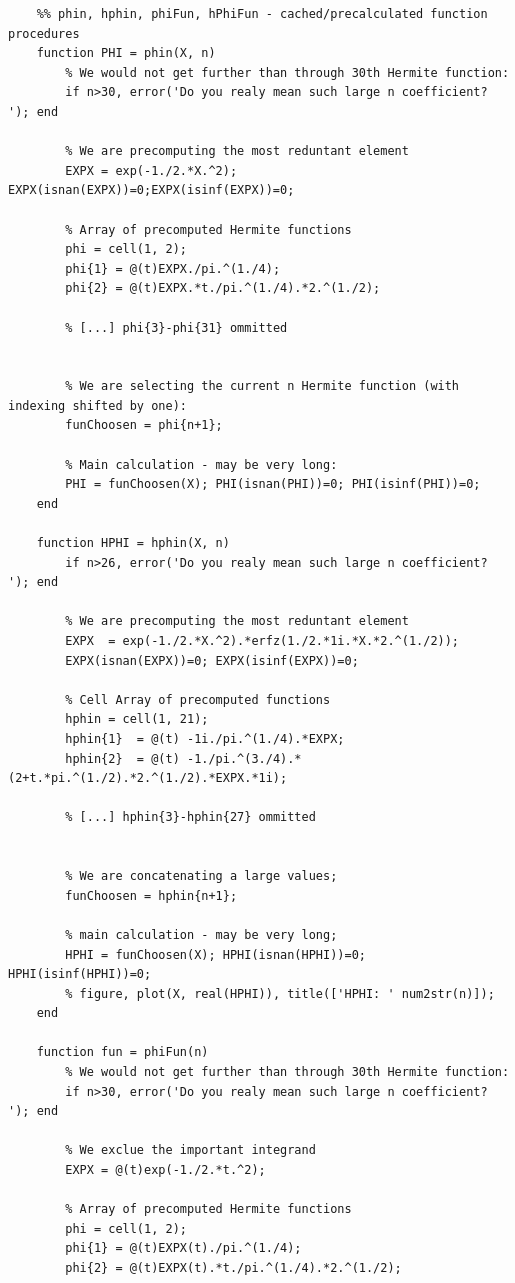 \documentclass[12pt,twoside,a4paper]{article}
\numberwithin{equation}{subsection}
\numberwithin{figure}{subsection}
\begin{document}
\begin{lstlisting}
	%% phin, hphin, phiFun, hPhiFun - cached/precalculated function procedures
	function PHI = phin(X, n)
	    % We would not get further than through 30th Hermite function:
	    if n>30, error('Do you realy mean such large n coefficient? '); end
	    
	    % We are precomputing the most reduntant element
	    EXPX = exp(-1./2.*X.^2); EXPX(isnan(EXPX))=0;EXPX(isinf(EXPX))=0;
	
	    % Array of precomputed Hermite functions
	    phi = cell(1, 2);
	    phi{1} = @(t)EXPX./pi.^(1./4);
	    phi{2} = @(t)EXPX.*t./pi.^(1./4).*2.^(1./2);
	    
	    % [...] phi{3}-phi{31} ommitted 
	    
	    
	    % We are selecting the current n Hermite function (with indexing shifted by one):
	    funChoosen = phi{n+1};
	    
	    % Main calculation - may be very long:
	    PHI = funChoosen(X); PHI(isnan(PHI))=0; PHI(isinf(PHI))=0;
	end
		
	function HPHI = hphin(X, n)
	    if n>26, error('Do you realy mean such large n coefficient? '); end
	    
	   	% We are precomputing the most reduntant element
	    EXPX  = exp(-1./2.*X.^2).*erfz(1./2.*1i.*X.*2.^(1./2)); 
	    EXPX(isnan(EXPX))=0; EXPX(isinf(EXPX))=0;
	
		% Cell Array of precomputed functions
	    hphin = cell(1, 21);
		hphin{1}  = @(t) -1i./pi.^(1./4).*EXPX;
		hphin{2}  = @(t) -1./pi.^(3./4).*(2+t.*pi.^(1./2).*2.^(1./2).*EXPX.*1i);
		
		% [...] hphin{3}-hphin{27} ommitted 
		
			 
	    % We are concatenating a large values;
	    funChoosen = hphin{n+1};
	    
	    % main calculation - may be very long;
	    HPHI = funChoosen(X); HPHI(isnan(HPHI))=0; HPHI(isinf(HPHI))=0;
	    % figure, plot(X, real(HPHI)), title(['HPHI: ' num2str(n)]);
	end
	
	function fun = phiFun(n)
	    % We would not get further than through 30th Hermite function:
	    if n>30, error('Do you realy mean such large n coefficient? '); end
	    
	    % We exclue the important integrand
	    EXPX = @(t)exp(-1./2.*t.^2);
	    
	    % Array of precomputed Hermite functions
	    phi = cell(1, 2);
	    phi{1} = @(t)EXPX(t)./pi.^(1./4);
	    phi{2} = @(t)EXPX(t).*t./pi.^(1./4).*2.^(1./2);
	    

\end{lstlisting}
\end{document}
